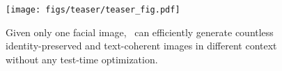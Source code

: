 \begin{figure}[t!]
  \centering
  \texttt{[image: figs/teaser/teaser\_fig.pdf]}
  \caption{Given only one facial image, \ours \ can efficiently generate countless identity-preserved and  text-coherent images in different context without any test-time optimization.}
  \label{fig:teaser}
\end{figure}

